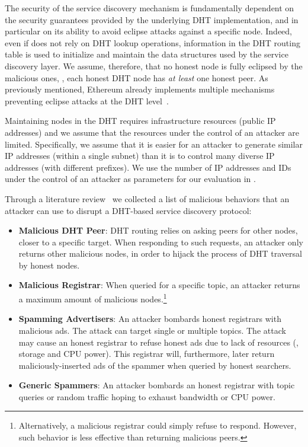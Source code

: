 The security of the service discovery mechanism is fundamentally dependent on the security guarantees provided by the underlying DHT implementation, and in particular on its ability to avoid eclipse attacks against a specific node.
Indeed, even if \sysname does not rely on DHT lookup operations, information in the DHT routing table is used to initialize and maintain the data structures used by the service discovery layer.
We assume, therefore, that no honest node is fully eclipsed by the malicious ones, \ie, each honest DHT node has \emph{at least} one honest peer.
As previously mentioned, Ethereum already implements multiple mechanisms preventing eclipse attacks at the DHT level~\cite{marcus2018low, henningsen2019eclipsing}.  

Maintaining nodes in the DHT requires infrastructure resources (public IP addresses) and we assume that the resources under the control of an attacker are limited.
Specifically, we assume that it is easier for an attacker to generate similar IP addresses (\ie within a single subnet) than it is to control many diverse IP addresses (with different prefixes).
We use the number of IP addresses and IDs under the control of an attacker as parameters for our evaluation in .

Through a literature review~\cite{chen2020survey, henningsen2019eclipsing} we collected a list of malicious behaviors that an attacker can use to disrupt a DHT-based service discovery protocol:
\begin{itemize}
    \item \textbf{Malicious DHT Peer}: DHT routing relies on asking peers for other nodes, closer to a specific target. When responding to such requests, an attacker only returns other malicious nodes, in order to hijack the process of DHT traversal by honest nodes.  
    \item \textbf{Malicious Registrar}: When queried for a specific topic, an attacker returns a maximum amount of malicious nodes.\footnote{Alternatively, a malicious registrar could simply refuse to respond. However, such behavior is less effective than returning malicious peers.}
    \item \textbf{Spamming Advertisers}: An attacker bombards honest registrars with malicious ads. The attack can target single or multiple topics. The attack may cause an honest registrar to refuse honest ads due to lack of resources (\eg, storage and CPU power). This registrar will, furthermore, later return maliciously-inserted ads of the spammer when queried by honest searchers. 
    \item \textbf{Generic Spammers}: An attacker bombards an honest registrar with topic queries or random traffic hoping to exhaust bandwidth or CPU power.
\end{itemize}

